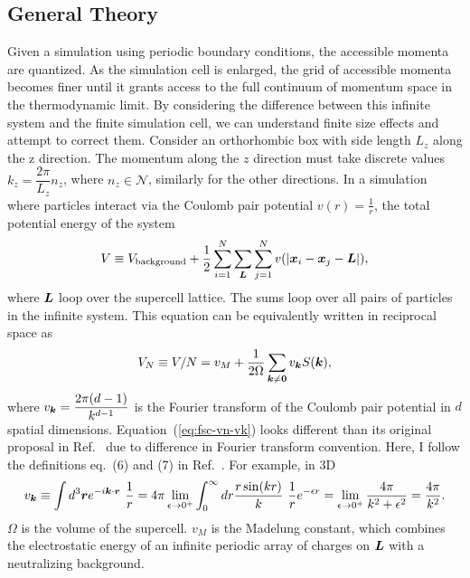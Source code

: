 \subsection{General Theory}
Given a simulation using periodic boundary conditions, the accessible momenta are quantized. As the simulation cell is enlarged, the grid of accessible momenta becomes finer until it grants access to the full continuum of momentum space in the thermodynamic limit. By considering the difference between this infinite system and the finite simulation cell, we can understand finite size effects and attempt to correct them.
Consider an orthorhombic box with side length $L_z$ along the z direction. The momentum along the $z$ direction must take discrete values $k_z=\dfrac{2\pi}{L_z}n_z$, where $n_z\in\mathcal{N}$, similarly for the other directions.
In a simulation where particles interact via the Coulomb pair potential $v(r)=\frac{1}{r}$, the total potential energy of the system %
\begin{align}
V \equiv V_{\text{background}} +
\frac{1}{2}\sum\limits_{i=1}^N
\sum\limits_{\boldsymbol{L}}\sum\limits_{j=1}^N
v(\vert\boldsymbol{x}_i-\boldsymbol{x}_j-\boldsymbol{L}\vert),
\end{align}
where $\boldsymbol{L}$ loop over the supercell lattice.
The sums loop over all pairs of particles in the infinite system.
This equation can be equivalently written in reciprocal space as
\begin{align} \label{eq:fsc-vn-vk}
V_N \equiv V/N = v_M + \frac{1}{2\Omega} \sum\limits_{\boldsymbol{k}\neq\boldsymbol{0}} v_{\boldsymbol{k}} S(\boldsymbol{k}),
\end{align}
where $v_{\boldsymbol{k}}=\dfrac{2\pi (d-1)}{k^{d-1}}$ is the Fourier transform of the Coulomb pair potential in $d$ spatial dimensions. Equation~(\ref{eq:fsc-vn-vk}) looks different than its original proposal in Ref.~\cite{Chiesa2006} due to difference in Fourier transform convention. Here, I follow the definitions eq.~(6) and (7) in Ref.~\cite{Holzmann2016}.
For example, in 3D
\begin{align}
v_{\boldsymbol{k}} \equiv \int d^3\boldsymbol{r} e^{-i\boldsymbol{k}\cdot\boldsymbol{r}}~\frac{1}{r}
=4\pi \lim\limits_{\epsilon\rightarrow 0^+} \int_0^\infty dr \dfrac{r\sin(kr)}{k}~\frac{1}{r}e^{-\epsilon r} = \lim\limits_{\epsilon\rightarrow 0^+} \dfrac{4\pi}{k^2+\epsilon^2}=\dfrac{4\pi}{k^2}.
\end{align}
$\Omega$ is the volume of the supercell. $v_M$ is the Madelung constant, which combines the electrostatic energy of an infinite periodic array of charges on $\boldsymbol{L}$ with a neutralizing background.

